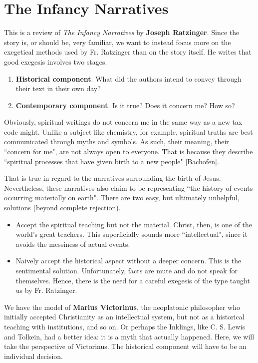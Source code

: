 \section{The Infancy Narratives}

This is a review of \emph{The Infancy Narratives} by \textbf{Joseph Ratzinger}. Since the story is, or should be, very familiar, we want to instead focus more on the exegetical methods used by Fr. Ratzinger than on the story itself. He writes that good exegesis involves two stages.

\begin{enumerate}
\item \textbf{Historical component}. What did the authors intend to convey through their text in their own day? 
\item \textbf{Contemporary component}. Is it true? Does it concern me? How so? 
\end{enumerate}
Obviously, spiritual writings do not concern me in the same way as a new tax code might. Unlike a subject like chemistry, for example, spiritual truths are best communicated through myths and symbols. As such, their meaning, their ``concern for me", are not always open to everyone. That is because they describe ``spiritual processes that have given birth to a new people" [Bachofen].

That is true in regard to the narratives surrounding the birth of Jesus. Nevertheless, these narratives also claim to be representing ``the history of events occurring materially on earth". There are two easy, but ultimately unhelpful, solutions (beyond complete rejection).

\begin{itemize}
\item Accept the spiritual teaching but not the material. Christ, then, is one of the world's great teachers. This superficially sounds more ``intellectual", since it avoids the messiness of actual events. 
\item Naively accept the historical aspect without a deeper concern. This is the sentimental solution. Unfortunately, facts are mute and do not speak for themselves. Hence, there is the need for a careful exegesis of the type taught us by Fr. Ratzinger. 
\end{itemize}
We have the model of \textbf{Marius Victorinus}, the neoplatonic philosopher who initially accepted Christianity as an intellectual system, but not as a historical teaching with institutions, and so on. Or perhaps the Inklings, like C. S. Lewis and Tolkein, had a better idea: it is a myth that actually happened. Here, we will take the perspective of Victorinus. The historical component will have to be an individual decision.

